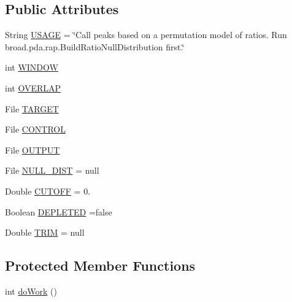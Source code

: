 \subsection*{Public Attributes}
\begin{DoxyCompactItemize}
\item 
String \hyperlink{classbroad_1_1pda_1_1seq_1_1rap_1_1_ratio_permutation_peak_caller_aa6eb3219446eb3ceebff6d3ae1ad4a91}{U\+S\+A\+G\+E} = \char`\"{}Call peaks based on a permutation model of ratios. Run broad.\+pda.\+rap.\+Build\+Ratio\+Null\+Distribution first.\char`\"{}
\item 
int \hyperlink{classbroad_1_1pda_1_1seq_1_1rap_1_1_ratio_permutation_peak_caller_a41582385ffcdc555e23b6e0f7b6589d4}{W\+I\+N\+D\+O\+W}
\item 
int \hyperlink{classbroad_1_1pda_1_1seq_1_1rap_1_1_ratio_permutation_peak_caller_ad9c881b1e90668688c5ec874e41995f1}{O\+V\+E\+R\+L\+A\+P}
\item 
File \hyperlink{classbroad_1_1pda_1_1seq_1_1rap_1_1_ratio_permutation_peak_caller_a0818fe3136ca9de4b02c8fba15392d5e}{T\+A\+R\+G\+E\+T}
\item 
File \hyperlink{classbroad_1_1pda_1_1seq_1_1rap_1_1_ratio_permutation_peak_caller_a1c4c5d03165fa9a6a3cbdbb11bc78916}{C\+O\+N\+T\+R\+O\+L}
\item 
File \hyperlink{classbroad_1_1pda_1_1seq_1_1rap_1_1_ratio_permutation_peak_caller_a9b7decdbde8575f4c1633cb86ccdf119}{O\+U\+T\+P\+U\+T}
\item 
File \hyperlink{classbroad_1_1pda_1_1seq_1_1rap_1_1_ratio_permutation_peak_caller_a094ab8090b5a6513773ff351ad6a382f}{N\+U\+L\+L\+\_\+\+D\+I\+S\+T} = null
\item 
Double \hyperlink{classbroad_1_1pda_1_1seq_1_1rap_1_1_ratio_permutation_peak_caller_a4c6cfaac4d6b4f8ef4c76dcf8872319e}{C\+U\+T\+O\+F\+F} = 0.
\item 
Boolean \hyperlink{classbroad_1_1pda_1_1seq_1_1rap_1_1_ratio_permutation_peak_caller_aec7e52f341224551996702711f9ea41d}{D\+E\+P\+L\+E\+T\+E\+D} =false
\item 
Double \hyperlink{classbroad_1_1pda_1_1seq_1_1rap_1_1_ratio_permutation_peak_caller_a2dcfa80a6f21231104478324f177d962}{T\+R\+I\+M} = null
\end{DoxyCompactItemize}
\subsection*{Protected Member Functions}
\begin{DoxyCompactItemize}
\item 
int \hyperlink{classbroad_1_1pda_1_1seq_1_1rap_1_1_ratio_permutation_peak_caller_aa20e33f4c23790c7472fb6bc96845e36}{do\+Work} ()
\end{DoxyCompactItemize}
